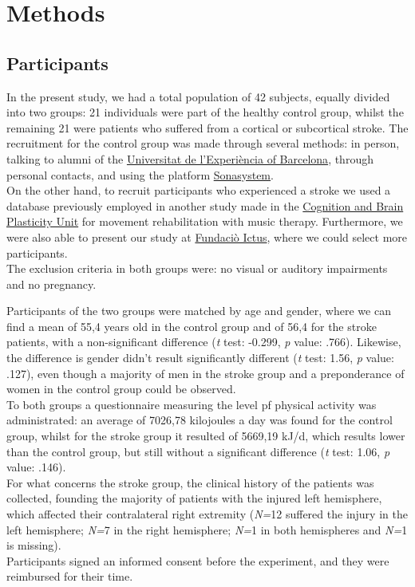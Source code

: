 \chapter{Methods}
\section{Participants}
In the present study, we had a total population of 42 subjects, equally divided into two groups: 21 individuals were part of the healthy control group, whilst the remaining 21 were patients who suffered from a cortical or subcortical stroke. The recruitment for the control group was made through several methods: in person, talking to alumni of the \href{https://www.experiencia.ub.edu/ca/}{Universitat de l'Experiència of Barcelona}, through personal contacts, and using the platform \href{https://www.sona-systems.com/}{Sonasystem}. \\
On the other hand, to recruit participants who experienced a stroke we used a database previously employed in another study made in the \href{https://brainvitge.org/}{Cognition and Brain Plasticity Unit} for movement rehabilitation with music therapy. Furthermore, we were also able to present our study at \href{https://www.fundacioictus.com/}{Fundaciò Ictus}, where we could select more participants. \\ 
The exclusion criteria in both groups were: no visual or auditory impairments and no pregnancy.

Participants of the two groups were matched by age and gender, where we can find a mean of 55,4 years old in the control group and of 56,4 for the stroke patients, with a non-significant difference (\textit{t} test: -0.299, \textit{p} value: .766). Likewise, the difference is gender didn't result significantly different (\textit{t} test: 1.56, \textit{p} value: .127), even though a majority of men in the stroke group and a preponderance of women in the control group could be observed. \\ To both groups a questionnaire measuring the level pf physical activity was administrated: an average of 7026,78 kilojoules a day was found for the control group, whilst for the stroke group it resulted of 5669,19 kJ/d, which results lower than the control group, but still without a significant difference (\textit{t} test: 1.06, \textit{p} value: .146). \\
For what concerns the stroke group, the clinical history of the patients was collected, founding the majority of patients with the injured left hemisphere, which affected their contralateral right extremity (\textit{N=}12 suffered the injury in the left hemisphere; \textit{N=}7 in the right hemisphere; \textit{N=}1 in both hemispheres and \textit{N=}1 is missing).\\ 
Participants signed an informed consent before the experiment, and they were reimbursed for their time. 

